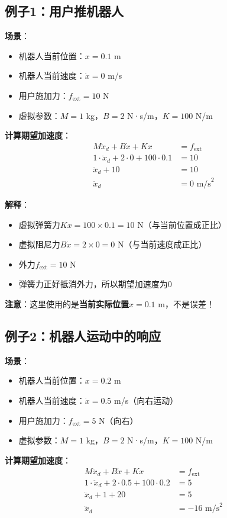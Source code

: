 \documentclass[12pt,a4paper]{article}
\begin{document}
\subsection{例子1：用户推机器人}

\textbf{场景}：
\begin{itemize}
\item 机器人当前位置：$x = 0.1$ m
\item 机器人当前速度：$\dot{x} = 0$ m/s
\item 用户施加力：$f_{\text{ext}} = 10$ N
\item 虚拟参数：$M = 1$ kg，$B = 2$ N·s/m，$K = 100$ N/m
\end{itemize}

\textbf{计算期望加速度}：
\begin{align}
M\ddot{x}_d + B\dot{x} + Kx &= f_{\text{ext}} \\
1 \cdot \ddot{x}_d + 2 \cdot 0 + 100 \cdot 0.1 &= 10 \\
\ddot{x}_d + 10 &= 10 \\
\ddot{x}_d &= 0 \text{ m/s}^2
\end{align}

\textbf{解释}：
\begin{itemize}
\item 虚拟弹簧力$Kx = 100 \times 0.1 = 10$ N（与当前位置成正比）
\item 虚拟阻尼力$B\dot{x} = 2 \times 0 = 0$ N（与当前速度成正比）
\item 外力$f_{\text{ext}} = 10$ N
\item 弹簧力正好抵消外力，所以期望加速度为0
\end{itemize}

\textbf{注意}：这里使用的是\textbf{当前实际位置}$x = 0.1$ m，不是误差！

\subsection{例子2：机器人运动中的响应}

\textbf{场景}：
\begin{itemize}
\item 机器人当前位置：$x = 0.2$ m
\item 机器人当前速度：$\dot{x} = 0.5$ m/s（向右运动）
\item 用户施加力：$f_{\text{ext}} = 5$ N（向右）
\item 虚拟参数：$M = 1$ kg，$B = 2$ N·s/m，$K = 100$ N/m
\end{itemize}

\textbf{计算期望加速度}：
\begin{align}
M\ddot{x}_d + B\dot{x} + Kx &= f_{\text{ext}} \\
1 \cdot \ddot{x}_d + 2 \cdot 0.5 + 100 \cdot 0.2 &= 5 \\
\ddot{x}_d + 1 + 20 &= 5 \\
\ddot{x}_d &= -16 \text{ m/s}^2
\end{align}
\end{document}
